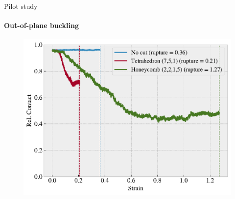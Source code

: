 \documentclass[
	10pt, %
]{beamer}
\begin{document}
%
%
\begin{frame}{Pilot study}
	\framesubtitle{Out-of-plane buckling}
	\begin{figure}[H]
		\centering
		\includegraphics[width=0.5\linewidth]{../thesis/figures/baseline/contact_vs_stretch.pdf}
	\end{figure}
\end{frame}
%
%
\end{document}
